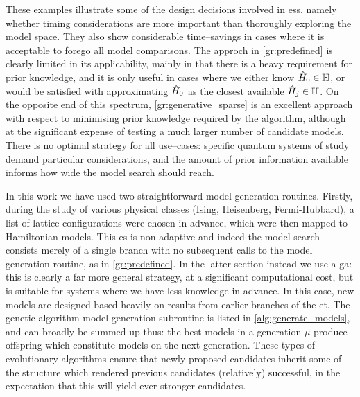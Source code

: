 These examples illustrate some of the design decisions involved in \gls{es}s, 
    namely whether timing considerations are more important than thoroughly exploring the model space.
They also show considerable time--savings in cases where it is
    acceptable to forego all model comparisons. 
The approch in \cref{gr:predefined} is clearly limited in its applicability, 
    mainly in that there is a heavy requirement for prior knowledge, 
    and it is only useful in cases where we either know $\hat{H}_0 \in \mathbb{H}$, 
    or would be satisfied with approximating $\hat{H}_0$ as the closest available $\hat{H}_j \in \mathbb{H}$. 
On the opposite end of this spectrum, \cref{gr:generative_sparse}  is an excellent approach
    with respect to minimising prior knowledge required by the algorithm, 
    although at the significant expense of testing a much larger number of candidate models. 
There is no optimal strategy for all use--cases: 
    specific quantum systems of study demand particular considerations, 
    and the amount of prior information available informs how wide the model search should reach. 

\par 

In this work we have used two straightforward model generation routines.
Firstly, during the study of various physical classes (Ising, Heisenberg, Fermi-Hubbard), 
    a list of lattice configurations were chosen in advance,
    which were then mapped to Hamiltonian models.
This \gls{es} is non-adaptive and indeed the model search
    consists merely of a single branch with no subsequent calls to the model generation routine, 
    as in \cref{gr:predefined}. 
In the latter section instead we use a \gls{ga}:
    this is clearly a far more general strategy, at a significant computational cost, 
    but is suitable for systems where we have less knowledge in advance. 
In this case, new models are designed based heavily on results from earlier branches of the \gls{et}. 
The genetic algorithm model generation subroutine is listed in \cref{alg:generate_models}, 
    and can broadly be summed up thus: 
    the best models in a generation $\mu$ produce offspring which constitute models on the next generation.
These types of evolutionary algorithms ensure that newly proposed candidates inherit 
    some of the structure which rendered previous candidates (relatively) successful, 
    in the expectation that this will yield ever-stronger candidates. 


